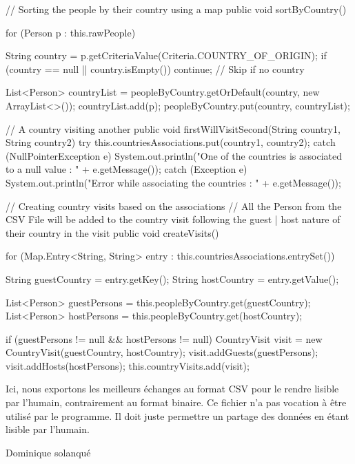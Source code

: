 \documentclass{mytex}
\begin{document}
\begin{codebox}
// Sorting the people by their country using a map
public void sortByCountry() {
	for (Person p : this.rawPeople) {
		String country = p.getCriteriaValue(Criteria.COUNTRY_OF_ORIGIN);
		if (country == null || country.isEmpty()) continue; // Skip if no country
		
		List<Person> countryList = peopleByCountry.getOrDefault(country, new ArrayList<>());
		countryList.add(p);
		peopleByCountry.put(country, countryList);
	}
}

// A country visiting another
public void firstWillVisitSecond(String country1, String country2) {
	try {
		this.countriesAssociations.put(country1, country2);
	} catch (NullPointerException e) {
		System.out.println("One of the countries is associated to a null value : " + e.getMessage());
	} catch (Exception e) {
		System.out.println("Error while associating the countries : " + e.getMessage());
	}   
}

// Creating country visits based on the associations
// All the Person from the CSV File will be added to the country visit following the guest | host nature of their country in the visit
public void createVisits() {
	for (Map.Entry<String, String> entry : this.countriesAssociations.entrySet()) {
		String guestCountry = entry.getKey();
		String hostCountry = entry.getValue();
		
		List<Person> guestPersons = this.peopleByCountry.get(guestCountry);
		List<Person> hostPersons = this.peopleByCountry.get(hostCountry);
		
		if (guestPersons != null && hostPersons != null) {
			CountryVisit visit = new CountryVisit(guestCountry, hostCountry);
			visit.addGuests(guestPersons);
			visit.addHosts(hostPersons);
			this.countryVisits.add(visit);
		}
	}
}
\end{codebox}



Ici, nous exportons les meilleurs échanges au format CSV pour le rendre lisible par l'humain, contrairement au format binaire. Ce fichier n'a pas vocation à être utilisé par le programme. Il doit juste permettre un partage des données en étant lisible par l'humain.

Dominique solanqué
\end{document}
